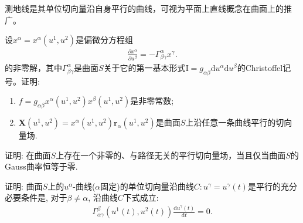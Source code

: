 \documentclass[../../main.tex]{subfiles}%
\begin{document}
\begin{remark}
测地线是其单位切向量沿自身平行的曲线，可视为平面上直线概念在曲面上的推广。
\end{remark}

\begin{example}
设$x^\alpha = x^\alpha(u^1,u^2)$是偏微分方程组
\begin{align*}
\frac{\partial x^\alpha}{\partial u^\beta} = -\Gamma^\alpha_{\beta\gamma}x^\gamma.
\end{align*}
的非零解，其中$\Gamma^\alpha_{\beta\gamma}$是曲面$S$关于它的第一基本形式$\mathrm{I}=g_{\alpha\beta}\mathrm{d}u^\alpha\mathrm{d}u^\beta$的Christoffel记号。证明:
\begin{enumerate}[(1)]
\item $f = g_{\alpha\beta}x^\alpha(u^1,u^2)x^\beta(u^1,u^2)$是非零常数;
\item $\boldsymbol{X}(u^1,u^2) = x^\alpha(u^1,u^2)\boldsymbol{r}_\alpha(u^1,u^2)$是曲面$S$上沿任意一条曲线平行的切向量场.
\end{enumerate}
\end{example}

\begin{example}
证明: 在曲面$S$上存在一个非零的、与路径无关的平行切向量场，当且仅当曲面$S$的Gauss曲率恒等于零.
\end{example}

\begin{example}
证明: 曲面$S$上的$u^\alpha$-曲线($\alpha$固定)的单位切向量沿曲线$C:u^\gamma = u^\gamma(t)$是平行的充分必要条件是, 对于$\beta \neq \alpha$, 沿曲线$C$下式成立:
\begin{align*}
\Gamma^\beta_{\alpha\gamma}(u^1(t),u^2(t))\frac{\mathrm{d}u^\gamma(t)}{\mathrm{d}t} = 0.
\end{align*}
\end{example}
\end{document}
